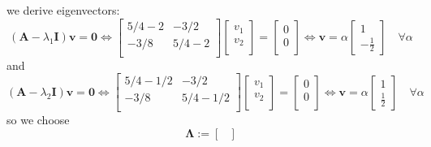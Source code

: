\documentclass[12pt,a4paper]{article}
\begin{document}
\begin{itemize}
\begin{itemize}
    we derive eigenvectors:
    \begin{equation}\nonumber%
      (\bm{A}-\lambda_{1}\bm{I})\bm{v}
      = \bm{0}
      \iff
      \begin{bmatrix}
        5/4 - 2 & - 3/2 \\
        -3/8 & 5/4 - 2 \\
      \end{bmatrix}
      \begin{bmatrix}
        v_{1} \\
        v_{2} \\
      \end{bmatrix}
      =
      \begin{bmatrix}
        0 \\
        0 \\
      \end{bmatrix}
      \iff
      \bm{v} = \alpha
      \begin{bmatrix}
        1 \\
        -\frac{1}{2}
      \end{bmatrix}
      \quad \forall \alpha
    \end{equation}
    and
    \begin{equation}\nonumber%
      (\bm{A}-\lambda_{2}\bm{I})\bm{v}
      = \bm{0}
      \iff
      \begin{bmatrix}
        5/4 - 1/2 & - 3/2 \\
        -3/8 & 5/4 - 1/2 \\
      \end{bmatrix}
      \begin{bmatrix}
        v_{1} \\
        v_{2} \\
      \end{bmatrix}
      =
      \begin{bmatrix}
        0 \\
        0 \\
      \end{bmatrix}
      \iff
      \bm{v} = \alpha
      \begin{bmatrix}
        1 \\
        \frac{1}{2}
      \end{bmatrix}
      \quad \forall \alpha
    \end{equation}
    so we choose
    \begin{equation}\nonumber%
      \bm{\Lambda}:=
      \begin{bmatrix}

\end{bmatrix}
\end{equation}
\end{itemize}
\end{itemize}
\end{document}
